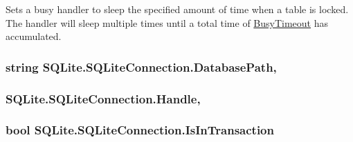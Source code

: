 Sets a busy handler to sleep the specified amount of time when a table is locked. The handler will sleep multiple times until a total time of \hyperlink{class_s_q_lite_1_1_s_q_lite_connection_abb2b70df282aa2f1af07789db65db1dd}{Busy\+Timeout} has accumulated. 

\hypertarget{class_s_q_lite_1_1_s_q_lite_connection_a18b410ed380268c16bb9bdb47b5ad44b}{
\subsubsection[{Database\+Path}]{\setlength{\rightskip}{0pt plus 5cm}string S\+Q\+Lite.\+S\+Q\+Lite\+Connection.\+Database\+Path\hspace{0.3cm}{\ttfamily [get]}, {\ttfamily [set]}}}\label{class_s_q_lite_1_1_s_q_lite_connection_a18b410ed380268c16bb9bdb47b5ad44b}
\hypertarget{class_s_q_lite_1_1_s_q_lite_connection_a504b348bb83df3b51fb49937db4d7804}{
\subsubsection[{Handle}]{ S\+Q\+Lite.\+S\+Q\+Lite\+Connection.\+Handle\hspace{0.3cm}{\ttfamily [get]}, {\ttfamily [set]}}}\label{class_s_q_lite_1_1_s_q_lite_connection_a504b348bb83df3b51fb49937db4d7804}
\hypertarget{class_s_q_lite_1_1_s_q_lite_connection_a9450dfedb603c08eb75f57f36db41d9b}{
\subsubsection[{Is\+In\+Transaction}]{\setlength{\rightskip}{0pt plus 5cm}bool S\+Q\+Lite.\+S\+Q\+Lite\+Connection.\+Is\+In\+Transaction\hspace{0.3cm}{\ttfamily [get]}}}\label{class_s_q_lite_1_1_s_q_lite_connection_a9450dfedb603c08eb75f57f36db41d9b}


